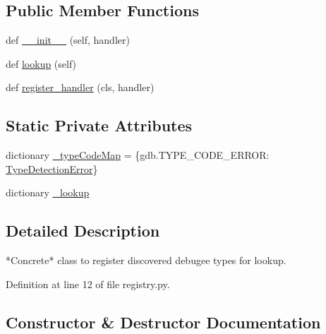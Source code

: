 \subsection*{Public Member Functions}
\begin{DoxyCompactItemize}
\item 
def \hyperlink{classmemoryoracle_1_1registry_1_1TypeRegistration_ad2ccbebf4c4f7c5ffced2caa21bb848c}{\+\_\+\+\_\+init\+\_\+\+\_\+} (self, handler)
\item 
def \hyperlink{classmemoryoracle_1_1registry_1_1TypeRegistration_aaee3c9526b626cf5c09203ea8c79751b}{lookup} (self)
\item 
def \hyperlink{classmemoryoracle_1_1registry_1_1TypeRegistration_a3f017524239fb80650039bd4ab927f73}{register\+\_\+handler} (cls, handler)
\end{DoxyCompactItemize}
\subsection*{Static Private Attributes}
\begin{DoxyCompactItemize}
\item 
dictionary \hyperlink{classmemoryoracle_1_1registry_1_1TypeRegistration_a0f8bbbddaa054388c8c84efef397d967}{\+\_\+type\+Code\+Map} = \{gdb.\+T\+Y\+P\+E\+\_\+\+C\+O\+D\+E\+\_\+\+E\+R\+R\+O\+R\+: \hyperlink{classmemoryoracle_1_1registry_1_1TypeDetectionError}{Type\+Detection\+Error}\}
\item 
dictionary \hyperlink{classmemoryoracle_1_1registry_1_1TypeRegistration_a08416d99733193baf2dec4208043c793}{\+\_\+lookup}
\end{DoxyCompactItemize}


\subsection{Detailed Description}
\begin{DoxyVerb}*Concrete* class to register discovered debugee types for lookup.
\end{DoxyVerb}
 

Definition at line 12 of file registry.\+py.



\subsection{Constructor \& Destructor Documentation}
\hypertarget{classmemoryoracle_1_1registry_1_1TypeRegistration_ad2ccbebf4c4f7c5ffced2caa21bb848c}{}
